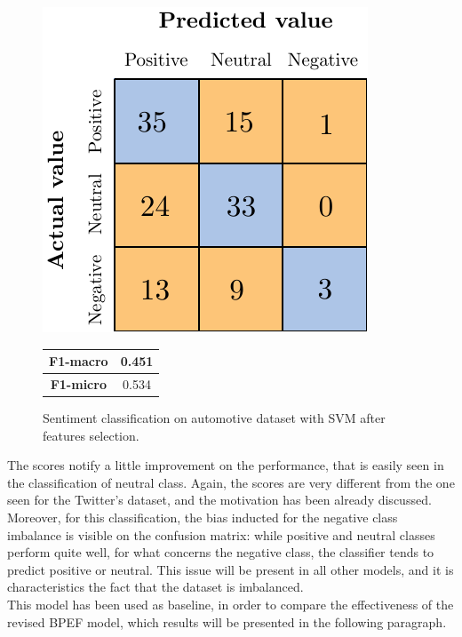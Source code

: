 \begin{figure}[H]
	\begin{minipage}[b]{0.6\linewidth}
		\centering
		\includegraphics[scale=1]{figures/conf_matrices/ita_snt_svm/ita_snt_svm_afs.pdf}
	\end{minipage}
	\begin{minipage}[b]{0.3\linewidth}
		\begin{tabular}[b]{ | c | c | } 
			\hline
			\textbf{F1-macro} & 0.451 \\
			\hline
			\textbf{F1-micro} & 0.534 \\ 
			\hline
		\end{tabular}
	\end{minipage}
	\caption{Sentiment classification on automotive dataset with SVM after features selection.}
	\label{fig:ita_snt_svm_afs}
\end{figure}



The scores notify a little improvement on the performance, that is easily seen in the classification of neutral class. Again, the scores are very different from the one seen for the Twitter's dataset, and the motivation has been already discussed. Moreover, for this classification, the bias inducted for the negative class imbalance is visible on the confusion matrix: while positive and neutral classes perform quite well, for what concerns the negative class, the classifier tends to predict positive or neutral. This issue will be present in all other models, and it is characteristics the fact that the dataset is imbalanced.\\
This model has been used as baseline, in order to compare the effectiveness of the revised BPEF model, which results will be presented in the following paragraph.


